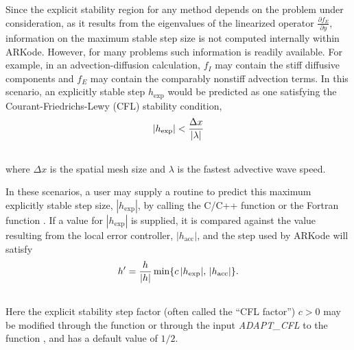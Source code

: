 \documentclass[letterpaper,10pt,english]{sphinxmanual}
\begin{document}
Since the explicit stability region for any method depends on the
problem under consideration, as it results from the eigenvalues of the
linearized operator $\frac{\partial f_E}{\partial y}$,
information on the maximum stable step size is not computed internally
within ARKode.  However, for many problems such information is
readily available.  For example, in an advection-diffusion calculation,
$f_I$ may contain the stiff diffusive components and
$f_E$ may contain the comparably nonstiff advection terms.  In
this scenario, an explicitly stable step $h_\text{exp}$ would be
predicted as one satisfying the Courant-Friedrichs-Lewy (CFL)
stability condition,
\begin{gather}
\begin{split}|h_\text{exp}| < \frac{\Delta x}{|\lambda|}\end{split}\notag\\\begin{split}\end{split}\notag
\end{gather}
where $\Delta x$ is the spatial mesh size and $\lambda$ is
the fastest advective wave speed.

In these scenarios, a user may supply a routine to predict this
maximum explicitly stable step size, $|h_\text{exp}|$, by calling the
C/C++ function {\hyperref[c_interface/User_callable:ARKodeSetStabilityFn]{}} or the Fortran
function {\hyperref[f_interface/Usage:f/_/FARKEXPSTABSET]{}}.  If a value for
$|h_\text{exp}|$ is supplied, it is compared against the value
resulting from the local error controller, $|h_\text{acc}|$, and
the step used by ARKode will satisfy
\begin{gather}
\begin{split}h' = \frac{h}{|h|}\min\{c\, |h_\text{exp}|,\, |h_\text{acc}|\}.\end{split}\notag\\\begin{split}\end{split}\notag
\end{gather}
Here the explicit stability step factor (often called the ``CFL
factor'') $c>0$ may be modified through the function
{\hyperref[c_interface/User_callable:ARKodeSetCFLFraction]{}} or through the input \emph{ADAPT\_CFL} to
the function {\hyperref[f_interface/Usage:f/_/FARKSETRIN]{}}, and has a default value of
$1/2$.
\end{document}
